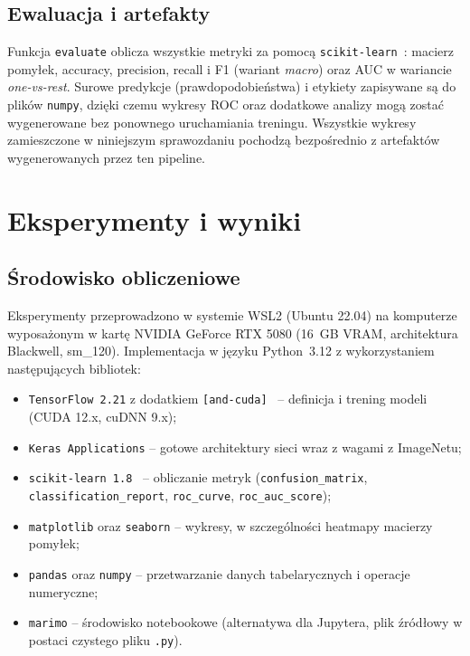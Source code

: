 \documentclass[12pt]{article}
\begin{document}
\subsection{Ewaluacja i artefakty}

Funkcja \texttt{evaluate} oblicza wszystkie metryki za pomocą \texttt{scikit-learn}~\cite{sklearn}: macierz pomyłek, accuracy, precision, recall i F1 (wariant \textit{macro}) oraz AUC w wariancie \textit{one-vs-rest}. Surowe predykcje (prawdopodobieństwa) i etykiety zapisywane są do plików \texttt{numpy}, dzięki czemu wykresy ROC oraz dodatkowe analizy mogą zostać wygenerowane bez ponownego uruchamiania treningu. Wszystkie wykresy zamieszczone w niniejszym sprawozdaniu pochodzą bezpośrednio z artefaktów wygenerowanych przez ten pipeline.

\section{Eksperymenty i wyniki}

\subsection{Środowisko obliczeniowe}

Eksperymenty przeprowadzono w systemie WSL2 (Ubuntu 22.04) na komputerze wyposażonym w kartę NVIDIA GeForce RTX 5080 (16~GB VRAM, architektura Blackwell, sm\_120). Implementacja w języku Python~3.12 z wykorzystaniem następujących bibliotek:

\begin{itemize}
  \item \texttt{TensorFlow 2.21} z dodatkiem \texttt{[and-cuda]}~\cite{tensorflow} -- definicja i trening modeli (CUDA 12.x, cuDNN 9.x);
  \item \texttt{Keras Applications} -- gotowe architektury sieci wraz z wagami z ImageNetu;
  \item \texttt{scikit-learn 1.8}~\cite{sklearn} -- obliczanie metryk (\texttt{confusion\_matrix}, \texttt{classification\_report}, \texttt{roc\_curve}, \texttt{roc\_auc\_score});
  \item \texttt{matplotlib} oraz \texttt{seaborn} -- wykresy, w szczególności heatmapy macierzy pomyłek;
  \item \texttt{pandas} oraz \texttt{numpy} -- przetwarzanie danych tabelarycznych i operacje numeryczne;
  \item \texttt{marimo} -- środowisko notebookowe (alternatywa dla Jupytera, plik źródłowy w postaci czystego pliku \texttt{.py}).
\end{itemize}
\end{document}
